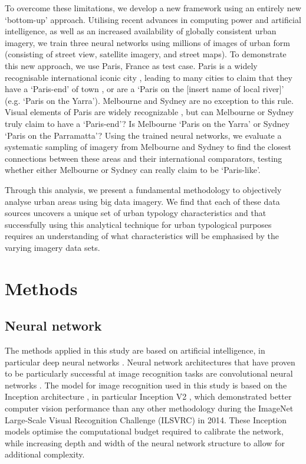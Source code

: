 \documentclass[10pt,letterpaper,hidelinks]{article}
\begin{document}
To overcome these limitations, we develop a new framework using an entirely new `bottom-up' approach. Utilising recent advances in computing power and artificial intelligence, as well as an increased availability of globally consistent urban imagery, we train three neural networks using millions of images of urban form (consisting of street view, satellite imagery, and street maps). To demonstrate this new approach, we use Paris, France as test case. Paris is a widely recognisable international iconic city \cite{Anholt2006}, leading to many cities to claim that they have a `Paris-end' of town \cite{Williams2010}, or are a `Paris on the [insert name of local river]' \cite{Wilden2013} (e.g. `Paris on the Yarra'). Melbourne and Sydney are no exception to this rule. Visual elements of Paris are widely recognizable \cite{Doersch2012}, but can Melbourne or Sydney truly claim to have a `Paris-end'? Is Melbourne `Paris on the Yarra' or Sydney `Paris on the Parramatta'? Using the trained neural networks, we evaluate a systematic sampling of imagery from Melbourne and Sydney to find the closest connections between these areas and their international comparators, testing whether either Melbourne or Sydney can really claim to be `Paris-like'.

Through this analysis, we present a fundamental methodology to objectively analyse urban areas using big data imagery. We find that each of these data sources uncovers a unique set of urban typology characteristics and that successfully using this analytical technique for urban typological purposes requires an understanding of what characteristics will be emphasised by the varying imagery data sets.

\section*{Methods}\label{sec:methods}
\subsection*{Neural network}\label{sec:methods1}

The methods applied in this study are based on artificial intelligence, in particular deep neural networks \cite{Bishop1995,Samarasinghe2016,Graupe2013}. Neural network architectures that have proven to be particularly successful at image recognition tasks are convolutional neural networks \cite{Schmidhuber2015}. The model for image recognition used in this study is based on the Inception architecture \cite{Szegedy2015}, in particular Inception V2 \cite{Ioffe2015}, which demonstrated better computer vision performance than any other methodology during the ImageNet Large-Scale Visual Recognition Challenge (ILSVRC) \cite{Russakovsky2015} in 2014. These Inception models optimise the computational budget required to calibrate the network, while increasing depth and width of the neural network structure to allow for additional complexity.
\end{document}
